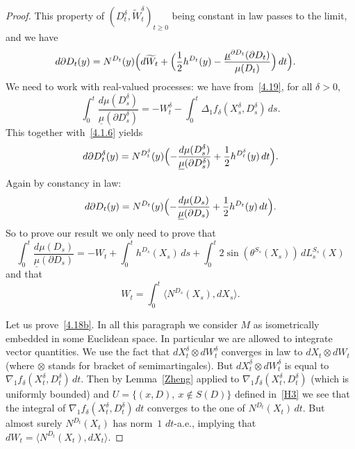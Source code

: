 \documentclass[10pt]{amsart}
\theoremstyle{plain}
\theoremstyle{definition}
\newcommand{\usm}{{\underline{\smash{\mu}}}}
\let\f\frac
\let\d\delta
\let\n\nabla
\let\wi\widetilde
\begin{document}
\begin{proof}
This property of $(D_t^\d, \wi W_t^\d)_{t\ge 0}$ being constant in law passes to the limit, and we have
\begin{equation}%
\begin{split}
d\partial D_t(y)&= N^{D_t}(y)\Bigl( d\wi{W}_t
+\Bigl( \f12 h^{D_t}(y) - \f{\usm^{\partial D_t}(\partial D_t)}{\mu(D_t)} \Bigr) \,dt \Bigr).
\end{split}
\end{equation}
We need to work with real-valued processes:
we have from~\eqref{4.19}, for all $\d>0$,
\begin{equation}
\label{4.17a}
\int_0^t\f{d\mu(D_s^\d)}{\underline{\mu}(\partial D_s^\d)}=-W_t^\d-\int_0^t\Delta_1f_\d (X_s^\d, D_s^\d)\, ds.
\end{equation}
This together with~\eqref{4.1.6} yields
\begin{equation}\label{4.1.9}
d\partial D^\d_t(y)= N^{D_t^\d}(y)\Bigl( -\f{d\mu(D_s^\d)}{\underline{\mu}(\partial D_s^\d)}
+ \f12 h^{D^\d_t}(y) \,dt \Bigr).
\end{equation}
Again by constancy in law:
\begin{equation}%
d\partial D_t(y)= N^{D_t}(y)\Bigl( -\f{d\mu(D_s)}{\underline{\mu}(\partial D_s)}
+ \f12 h^{D_t}(y) \,dt \Bigr).
\end{equation}
So to prove our result we only need to prove that
\begin{equation}
\label{4.18a}
\int_0^t\f{d\mu(D_s)}{\underline{\mu}(\partial D_s)}=-W_t+\int_0^t h^{D_s} (X_s)\, ds+\int_0^t2\sin\left(\theta^{S_s}(X_s)\right)\,dL_s^{S_s}(X)
\end{equation}
and that
\begin{equation}
\label{4.18b}
W_t=\int_0^t\langle N^{D_s}(X_s), dX_s\rangle.
\end{equation}

Let us prove~\eqref{4.18b}. In all this paragraph we consider $M$ as isometrically embedded in some Euclidean space. In particular we are allowed to integrate vector quantities. We use the fact that $dX_t^\d\otimes dW_t^\d$ converges in law to $dX_t\otimes dW_t$ (where $\otimes$ stands for bracket of semimartingales). But $dX_t^\d\otimes dW_t^\d$ is equal to $\n_1 f_\d(X_t^\d,D_t^\d)\, dt$.
Then by Lemma~\ref{Zheng} applied to $\n_1 f_\d(X_t^\d,D_t^\d)$ (which is uniformly bounded) and $U=\{(x,D), \ x\notin S(D)\}$ defined in~\eqref{H3} we see that the integral of $\n_1 f_\d(X_t^\d,D_t^\d)\, dt$ converges to the one of $N^{D_t}(X_t)\, dt$. But almost surely $N^{D_t}(X_t)$ has norm~$1$ $dt$-a.e., implying that $dW_t=\langle N^{D_t}(X_t), dX_t\rangle$.


\end{proof}
\end{document}
